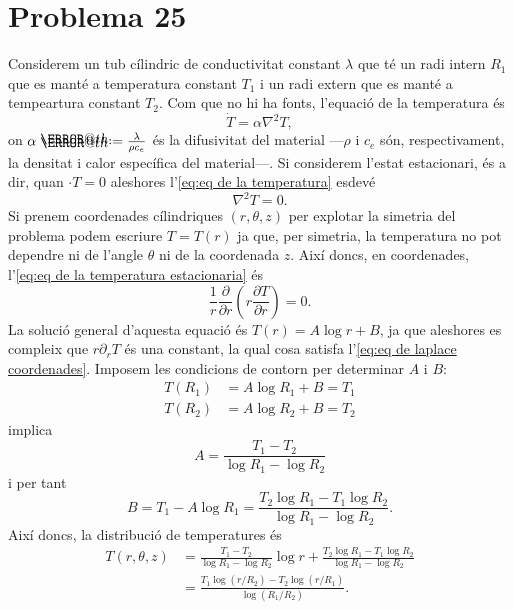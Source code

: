 \documentclass[12pt]{article}
\makeatletter
\newcommand*{\defeq}{\mathrel{\rlap{%
    \raisebox{0.3ex}{$\m@th\cdot$}}%
  \raisebox{-0.3ex}{$\m@th\cdot$}}%
=}
\makeatother
\begin{document}
\section{Problema 25}
Considerem un tub cílindric de conductivitat constant \( \lambda \) que té un radi intern \( R_1 \) que es manté a temperatura constant \( T_1 \) i un radi extern que es manté a tempeartura constant \( T_2 \). Com que no hi ha fonts, l'equació de la temperatura és  
\begin{equation} \label{eq:eq de la temperatura}
	\dot{T} = \alpha \nabla^2 T,
\end{equation}
on \( \alpha \defeq \frac{\lambda}{\rho c_e} \) és la difusivitat del material ---\( \rho \) i \( c_e \) són, respectivament, la densitat i calor específica del material---. Si considerem l'estat estacionari, és a dir, quan \( \cdot{T} = 0 \) aleshores l'\cref{eq:eq de la temperatura} esdevé
\begin{equation} \label{eq:eq de la temperatura estacionaria}
	\nabla^2 T = 0. 
\end{equation}
Si prenem coordenades cílindriques \( (r, \theta, z) \) per explotar la simetria del problema podem escriure \( T = T(r) \) ja que, per simetria, la temperatura no pot dependre ni de l'angle \( \theta \) ni de la coordenada \( z \). Així doncs, en coordenades, l'\cref{eq:eq de la temperatura estacionaria} és
\begin{equation} \label{eq:eq de laplace coordenades}
	\frac{1}{r} \frac{\partial}{\partial r} \left( r \frac{\partial T}{\partial r} \right) = 0. 
\end{equation}
La solució general d'aquesta equació és \( T(r) = A\log{r} + B \), ja que aleshores es compleix que \( r \partial_rT \) és una constant, la qual cosa satisfa l'\cref{eq:eq de laplace coordenades}. Imposem les condicions de contorn per determinar \( A \) i \( B \):
\begin{align*}
	T(R_1) &= A\log{R_1} + B = T_1 \\
	T(R_2) &= A\log{R_2} + B = T_2 
\end{align*}
implica
\begin{equation*}
 	A = \frac{T_1 - T_2}{\log{R_1} - \log{R_2}} 
\end{equation*}
i per tant
\begin{equation*}
	B = T_1 - A\log{R_1} = \frac{T_2 \log{R_1} - T_1 \log{R_2}}{\log{R_1} - \log{R_2}}. 
\end{equation*}
Així doncs, la distribució de temperatures és
\begin{equation} \label{eq:distribucio de temperatura}
	\begin{aligned}
		T(r,\theta,z) & = \frac{T_1 - T_2}{\log{R_1} - \log{R_2}}\log{r} + \frac{T_2 \log{R_1} - T_1 \log{R_2}}{\log{R_1} - \log{R_2}} \\
									& = \frac{T_1 \log{(r/R_2)} - T_2 \log{(r/R_1)}}{\log{(R_1/R_2)}}.
	\end{aligned}
\end{equation}
\end{document}
